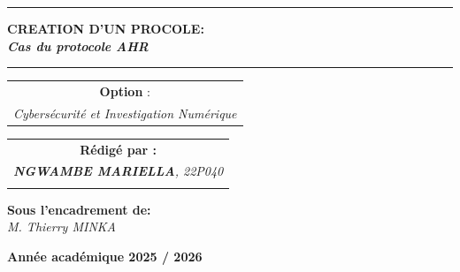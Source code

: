 \documentclass[memoire, 12pt]{report}
\begin{document}
\begin{titlepage}
\begin{center}
		\vspace{0.5cm}
		\begin{tabular}{l*{40}{@{\hskip 3.5cm}c@{\hskip5cm}} p{3.5cm} r}
		\end{tabular}
		
		\noindent\rule{\textwidth}{0.7mm}
		\Large{{\textbf{CREATION D'UN PROCOLE:}}}\\
		\Large{{\textbf{\textit{Cas du protocole AHR}}}}
		\noindent\rule{\textwidth}{0.7mm}
	\end{center}
		
	\begin{center}
	\begin{tabular}{c}
		
		\vspace{0.1cm}
		\normalsize
	
	
		\vspace{0.1cm}
		\normalsize\textbf{Option }:\\			
		\textsl{Cybersécurité et Investigation Numérique}
		
	\end{tabular}
	\end{center}
		
	\begin{center}
		\normalsize %
		\begin{tabular}{c}
			\vspace{0.07cm}
			\hspace{0.02cm} \textbf{\textbf{Rédigé par :}}\\
			\hspace{0.02cm} \textsl{\textbf{NGWAMBE  MARIELLA}, 22P040}\\\\
			
		\end{tabular}
	\end{center}
	
	\begin{center}
	\hspace{0.02cm} \textbf{Sous l'encadrement de:}\\
	\hspace{0.02cm} \textsl{M. Thierry MINKA}
	\end{center}
	
    
	\vspace{2cm}
	\begin{center}
		\textbf{Année académique 2025 / 2026}
	\end{center}
		
	\vspace{-1.4cm}
	
		
	\vfill%
	
\end{titlepage}
\tableofcontents
\newpage
\end{document}
